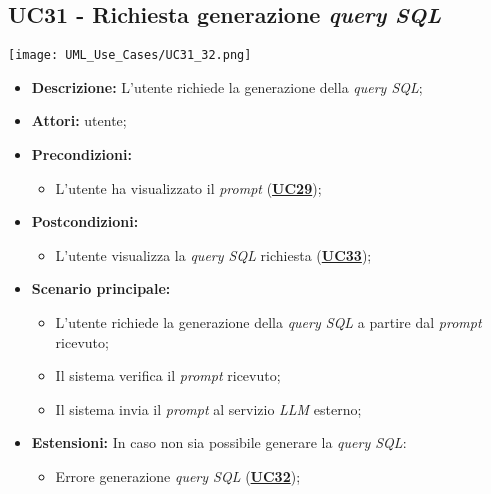 \subsection{UC31 - Richiesta generazione \textit{query SQL}}
\label{sec:UC31}
\texttt{[image: UML\_Use\_Cases/UC31\_32.png]}
\begin{itemize}
    \item \textbf{Descrizione:} L'utente richiede la generazione della \textit{query SQL};
    \item \textbf{Attori:} utente;
    \item \textbf{Precondizioni:} 
    \begin{itemize}
    	\item L'utente ha visualizzato il \textit{prompt} (\hyperref[sec:UC29]{\textbf{UC29}});
    \end{itemize}
    \item \textbf{Postcondizioni:} 
    \begin{itemize}
    	\item L'utente visualizza la \textit{query SQL} richiesta (\hyperref[sec:UC33]{\textbf{UC33}});
    \end{itemize}
    \item \textbf{Scenario principale:}
    \begin{itemize}
    	\item L'utente richiede la generazione della \textit{query SQL} a partire dal \textit{prompt} ricevuto;
    	\item Il sistema verifica il \textit{prompt} ricevuto;
    	\item Il sistema invia il \textit{prompt} al servizio \textit{LLM} esterno;
    \end{itemize}
    \item \textbf{Estensioni:} In caso non sia possibile generare la \textit{query SQL}:
    \begin{itemize}
    	\item Errore generazione \textit{query SQL} (\hyperref[sec:UC32]{\textbf{UC32}});
    \end{itemize}
\end{itemize}

